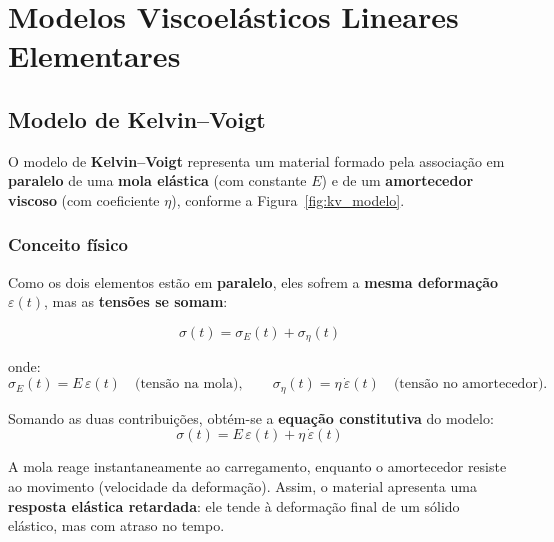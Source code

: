 \chapter{Modelos Viscoelásticos Lineares Elementares}

\section{Modelo de Kelvin--Voigt}

O modelo de \textbf{Kelvin--Voigt} representa um material formado pela associação em \textbf{paralelo} de uma \textbf{mola elástica} (com constante $E$) e de um \textbf{amortecedor viscoso} (com coeficiente $\eta$), conforme a Figura~\ref{fig:kv_modelo}.


\subsection*{Conceito físico}
Como os dois elementos estão em \textbf{paralelo}, eles sofrem a \textbf{mesma deformação} $\varepsilon(t)$, mas as \textbf{tensões se somam}:

\begin{equation}
\sigma(t) = \sigma_E(t) + \sigma_\eta(t)
\label{eq:kv_soma}
\end{equation}

onde:
\begin{equation}
\sigma_E(t) = E\,\varepsilon(t) 
\quad \text{(tensão na mola)}, 
\qquad
\sigma_\eta(t) = \eta\,\dot{\varepsilon}(t)
\quad \text{(tensão no amortecedor)}.
\label{eq:kv_componentes}
\end{equation}

Somando as duas contribuições, obtém-se a \textbf{equação constitutiva} do modelo:
\begin{equation}
\sigma(t) = E\,\varepsilon(t) + \eta\,\dot{\varepsilon}(t)
\label{eq:kv_constitutiva}
\end{equation}

A mola reage instantaneamente ao carregamento, enquanto o amortecedor resiste ao movimento (velocidade da deformação).  
Assim, o material apresenta uma \textbf{resposta elástica retardada}: ele tende à deformação final de um sólido elástico, mas com atraso no tempo.

